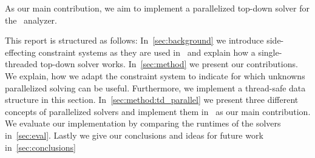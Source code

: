 As our main contribution, we aim to implement a parallelized top-down solver for the \gob\ analyzer.

This report is structured as follows: In~\autoref{sec:background} we introduce side-effecting constraint systems as they are used in \gob\ and explain how a single-threaded top-down solver works. In~\autoref{sec:method} we present our contributions. We explain, how we adapt the constraint system to indicate for which unknowns parallelized solving can be useful. Furthermore, we implement a thread-safe data structure in this section. In~\autoref{sec:method:td_parallel} we present three different concepts of parallelized solvers and implement them in \gob\ as our main contribution. We evaluate our implementation by comparing the runtimes of the solvers in~\autoref{sec:eval}. Lastly we give our conclusions and ideas for future work in~\autoref{sec:conclusions} 
